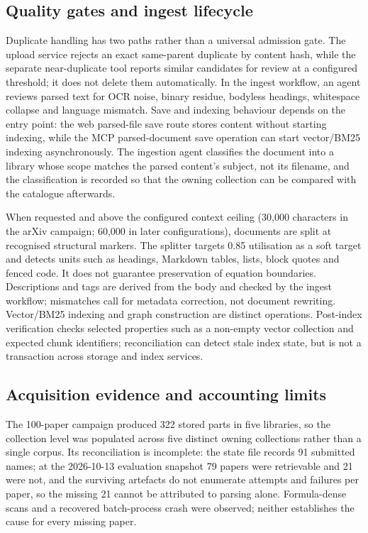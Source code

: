 \documentclass[11pt]{article}
\begin{document}
\subsection{Quality gates and ingest lifecycle}

Duplicate handling has two paths rather than a universal admission gate. The
upload service rejects an exact same-parent duplicate by content hash, while
the separate near-duplicate tool reports similar candidates for review at a
configured threshold; it does not delete them automatically. In the ingest
workflow, an agent reviews parsed text for OCR noise, binary residue, bodyless
headings, whitespace collapse and language mismatch. Save and indexing behaviour
depends on the entry point: the web parsed-file save route stores content
without starting indexing, while the MCP parsed-document save operation can
start vector/BM25 indexing asynchronously. The ingestion agent classifies the document into a library whose scope matches
the parsed content's subject, not its filename, and the classification is
recorded so that the owning collection can be compared with the catalogue
afterwards.

When requested and above the configured context ceiling (30,000 characters in
the arXiv campaign; 60,000 in later configurations), documents are split at
recognised structural markers. The splitter targets 0.85 utilisation as a
soft target and detects units such as headings, Markdown tables, lists, block
quotes and fenced code. It does not guarantee preservation of equation
boundaries. Descriptions and tags are derived from the body and checked by the
ingest workflow; mismatches call for metadata correction, not document
rewriting.
Vector/BM25 indexing and graph construction are distinct operations.
Post-index verification checks selected properties such as a non-empty vector
collection and expected chunk identifiers; reconciliation can detect stale
index state, but is not a transaction across storage and index services.

\subsection{Acquisition evidence and accounting limits}

The 100-paper campaign produced 322 stored parts in five libraries, so the
collection level was populated across five distinct owning collections rather
than a single corpus.
Its reconciliation is incomplete: the state file records 91 submitted names;
at the 2026-10-13 evaluation snapshot 79 papers were retrievable and 21 were
not, and
the surviving artefacts do not enumerate attempts and failures per paper, so
the missing 21 cannot be attributed to parsing alone. Formula-dense scans and
a recovered batch-process crash were observed; neither establishes the cause
for every missing paper.
\end{document}
